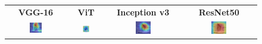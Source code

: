 \documentclass[a4paper,12pt]{report}
\begin{document}
\begin{figure}[H]
    \centering
    \setlength{\tabcolsep}{1pt}
    \begin{tabular}{cccc}
    \textbf{VGG-16} & \textbf{ViT} & \textbf{Inception v3} & \textbf{ResNet50} \\
    
    \includegraphics[width=0.22\textwidth]{images/appendix/modelgraph/vgg/correct/Glaucous_Winged_Gull/20241204_171110.jpg} &
    \includegraphics[width=0.22\textwidth]{images/appendix/modelgraph/vit/correct/Glaucous_Winged_Gull/20241204_171110.jpg} &
    \includegraphics[width=0.22\textwidth]{images/appendix/modelgraph/inception/correct/Glaucous_Winged_Gull/20241204_171110.jpg} &
    \includegraphics[width=0.22\textwidth]{images/appendix/modelgraph/resnet/correct/Glaucous_Winged_Gull/20241204_171110.jpg} \\
    \end{tabular}
 
    \label{fig:interpretability_glaucous_5}
\end{figure}
\end{document}
